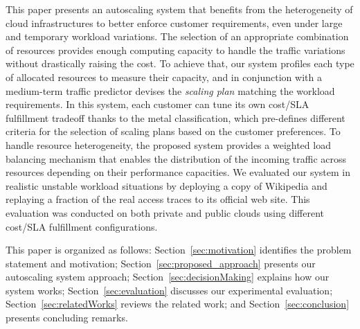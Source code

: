 This paper presents an autoscaling system that benefits from the
heterogeneity of cloud infrastructures to better enforce customer
requirements, even under large and temporary workload variations. The
selection of an appropriate combination of resources provides enough
computing capacity to handle the traffic variations without
drastically raising the cost. To achieve that, our system profiles
each type of allocated resources to measure their capacity, and in
conjunction with a medium-term traffic predictor devises
the \emph{scaling plan} matching the workload
requirements. In this system, each customer can tune its own cost/SLA
fulfillment tradeoff thanks to the metal classification, which
pre-defines different criteria for the selection of scaling plans
based on the customer preferences. To handle resource heterogeneity,
the proposed system provides a weighted load balancing mechanism that
enables the distribution of the incoming traffic across resources depending
on their performance capacities. We evaluated our system in realistic
unstable workload situations by deploying a copy of Wikipedia and
replaying a fraction of the real access traces to its official web
site. This evaluation was conducted on both private and public clouds
using different cost/SLA fulfillment configurations.

This paper is organized as follows: Section~\ref{sec:motivation} identifies the problem statement and
motivation; Section~\ref{sec:proposed_approach} presents our
autoscaling system approach; Section~\ref{sec:decisionMaking} explains
how our system works; Section~\ref{sec:evaluation} discusses
our experimental evaluation; Section~\ref{sec:relatedWorks} reviews
the related work; and Section~\ref{sec:conclusion} presents concluding
remarks.
